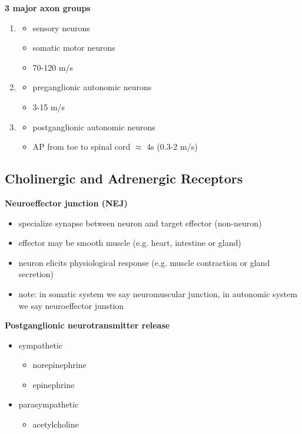 \documentclass[11pt,fleqn]{book} %
\begin{document}
\textbf{3 major axon groups}
\begin{enumerate}
    \item \begin{itemize}
        \item sensory neurons
        \item somatic motor neurons
        \item 70-120 m/s
    \end{itemize}
    \item \begin{itemize}
        \item preganglionic autonomic neurons
        \item 3-15 m/s
    \end{itemize}
    \item \begin{itemize}
        \item postganglionic autonomic neurons
        \item AP from toe to spinal cord $\approx$ 4s (0.3-2 m/s)
    \end{itemize}
\end{enumerate}

\subsection{Cholinergic and Adrenergic Receptors}
\textbf{Neuroeffector junction (NEJ)}
\begin{itemize}
    \item specialize synapse between neuron and target effector (non-neuron)
    \item effector may be smooth muscle (e.g. heart, intestine or gland)
    \item neuron elicits physiological response (e.g. muscle contraction or gland secretion)
    \item note: in somatic system we say neuromuscular junction, in autonomic system we say neuroeffector junstion
\end{itemize}

\textbf{Postganglionic neurotransmitter release}
\begin{itemize}
    \item sympathetic
    \begin{itemize}
        \item norepinephrine
        \item epinephrine
    \end{itemize}
    \item parasympathetic
    \begin{itemize}
        \item acetylcholine
    \end{itemize}
\end{itemize}
\end{document}
